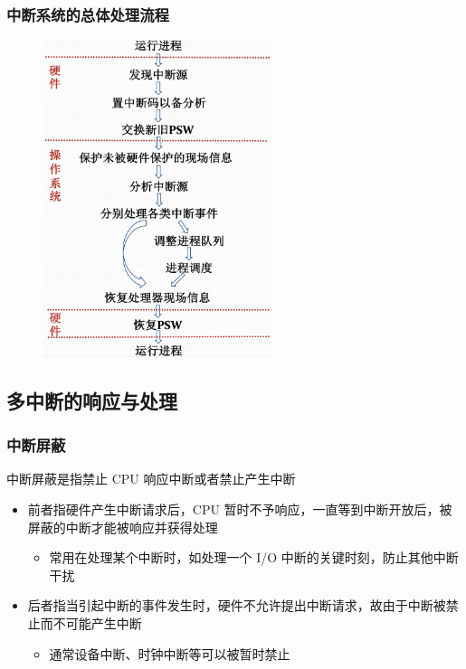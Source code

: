\documentclass[cs4size,a4paper,10pt]{ctexart}
\begin{document}
	\subsubsection{中断系统的总体处理流程}
	\begin{figure}[H]
		\centering
		\includegraphics[width=0.6\textwidth]{img/2.2.3.3}
	\end{figure}


	\subsection{多中断的响应与处理}
	\subsubsection{中断屏蔽}
	中断屏蔽是指禁止 CPU 响应中断或者禁止产生中断
	\begin{itemize}
		\item 前者指硬件产生中断请求后，CPU 暂时不予响应，一直等到中断开放后，被屏蔽的中断才能被响应并获得处理
		\begin{itemize}
			\item 常用在处理某个中断时，如处理一个 I/O 中断的关键时刻，防止其他中断干扰
		\end{itemize}
		\item 后者指当引起中断的事件发生时，硬件不允许提出中断请求，故由于中断被禁止而不可能产生中断
		\begin{itemize}
			\item 通常设备中断、时钟中断等可以被暂时禁止
		\end{itemize}
	\end{itemize}
\end{document}
